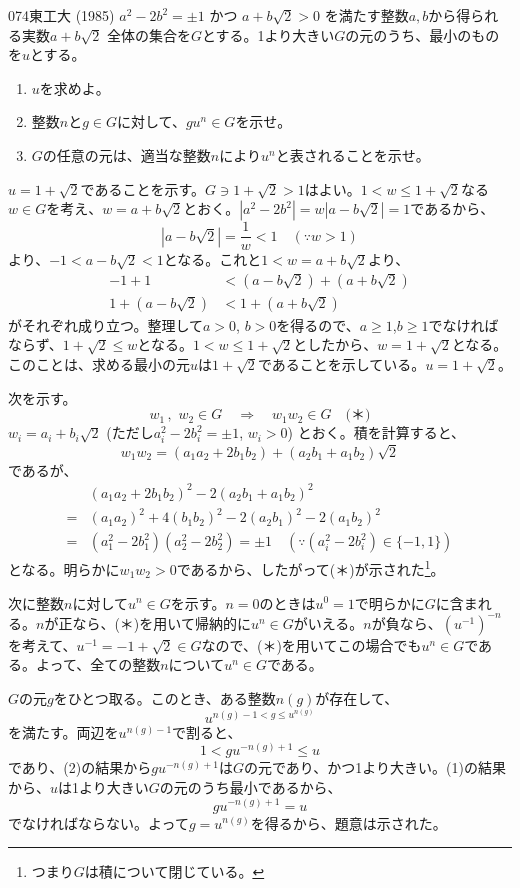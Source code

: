 \begin{thm}{074}{\maru}{東工大 (1985)}
 $a^2-2b^2=\pm 1$ かつ $a+b\sqrt{2}>0$ を満たす整数$a, b$から得られる実数$a+b\sqrt{2}$ 全体の集合を$G$とする。1より大きい$G$の元のうち、最小のものを$u$とする。
 \begin{enumerate}
  \item $u$を求めよ。
  \item 整数$n$と$g\in G$に対して、$gu^n\in G$を示せ。
  \item $G$の任意の元は、適当な整数$n$により$u^n$と表されることを示せ。
 \end{enumerate}
\end{thm}

$u=1+\sqrt{2}$であることを示す。$G\ni 1+\sqrt{2}>1$はよい。$1<w\le 1+\sqrt{2}$なる$w\in G$を考え、$w=a+b\sqrt{2}$とおく。$|a^2-2b^2|=w|a-b\sqrt{2}|=1$であるから、
\[ |a-b\sqrt{2}|=\frac{1}{w}<1 \quad (\because w>1) \]
より、$-1<a-b\sqrt{2}<1$となる。これと$1<w=a+b\sqrt{2}$より、
\begin{align*}
 -1+1&< (a-b\sqrt{2})+(a+b\sqrt{2}) \\
 1+(a-b\sqrt{2})&<1+(a+b\sqrt{2})
\end{align*}
がそれぞれ成り立つ。整理して$a>0$, $b>0$を得るので、$a\ge 1$,$b\ge 1$でなければならず、$1+\sqrt{2}\le w$となる。$1<w\le 1+\sqrt{2}$としたから、$w=1+\sqrt{2}$となる。このことは、求める最小の元$u$は$1+\sqrt{2}$であることを示している。$u=1+\sqrt{2}$。

次を示す。
\[ w_1 \,,\,\, w_2 \in G \quad\Rightarrow\quad w_1w_2\in G \quad\text{(＊)}\]
$w_i=a_i+b_i\sqrt{2}$ (ただし$a_i^2-2b_i^2=\pm 1$, $w_i>0$) とおく。積を計算すると、
\[ w_1w_2=(a_1a_2+2b_1b_2)+(a_2b_1+a_1b_2)\sqrt{2} \]
であるが、
\begin{align*}
 &(a_1a_2+2b_1b_2)^2-2(a_2b_1+a_1b_2)^2 \\
 =& (a_1a_2)^2+4(b_1b_2)^2-2(a_2b_1)^2-2(a_1b_2)^2 \\
 =& (a_1^2-2b_1^2)(a_2^2-2b_2^2)=\pm 1 \quad (\because (a_i^2-2b_i^2)\in\{-1, 1\})
\end{align*}
となる。明らかに$w_1w_2>0$であるから、したがって(＊)が示された\footnote{つまり$G$は積について閉じている。}。

次に整数$n$に対して$u^n\in G$を示す。$n=0$のときは$u^0=1$で明らかに$G$に含まれる。$n$が正なら、(＊)を用いて帰納的に$u^n \in G$がいえる。$n$が負なら、$(u^{-1})^{-n}$を考えて、$u^{-1}=-1+\sqrt{2} \in G$なので、(＊)を用いてこの場合でも$u^n \in G$である。よって、全ての整数$n$について$u^n \in G$である。

$G$の元$g$をひとつ取る。このとき、ある整数$n(g)$が存在して、
\[ u^{n(g)-1 < g \le u^{n(g)}} \]
を満たす。両辺を$u^{n(g)-1}$で割ると、
\[ 1 < g u^{-n(g)+1} \le u \]
であり、(2)の結果から$g u^{-n(g)+1}$は$G$の元であり、かつ1より大きい。(1)の結果から、$u$は1より大きい$G$の元のうち最小であるから、
\[ gu^{-n(g)+1}=u \]
でなければならない。よって$g=u^{n(g)}$を得るから、題意は示された。
